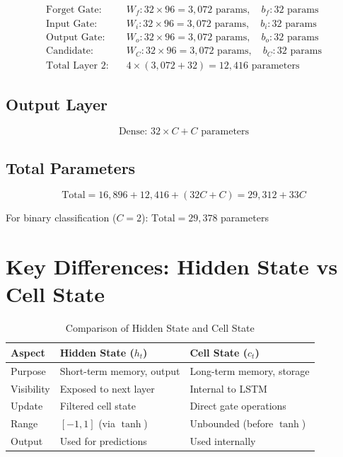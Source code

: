 \documentclass[12pt]{article}
\begin{document}
\[
\begin{aligned}
\text{Forget Gate:} &\quad W_f: 32 \times 96 = 3,072 \text{ params}, \quad b_f: 32 \text{ params} \\
\text{Input Gate:} &\quad W_i: 32 \times 96 = 3,072 \text{ params}, \quad b_i: 32 \text{ params} \\
\text{Output Gate:} &\quad W_o: 32 \times 96 = 3,072 \text{ params}, \quad b_o: 32 \text{ params} \\
\text{Candidate:} &\quad W_C: 32 \times 96 = 3,072 \text{ params}, \quad b_C: 32 \text{ params} \\
\text{Total Layer 2:} &\quad 4 \times (3,072 + 32) = 12,416 \text{ parameters}
\end{aligned}
\]

\subsection{Output Layer}

\[
\text{Dense: } 32 \times C + C \text{ parameters}
\]

\subsection{Total Parameters}

\[
\text{Total} = 16,896 + 12,416 + (32C + C) = 29,312 + 33C
\]

For binary classification ($C = 2$): $\text{Total} = 29,378$ parameters

\section{Key Differences: Hidden State vs Cell State}

\begin{table}[h]
\centering
\begin{tabular}{|l|l|l|}
\hline
\textbf{Aspect} & \textbf{Hidden State ($h_t$)} & \textbf{Cell State ($c_t$)} \\
\hline
Purpose & Short-term memory, output & Long-term memory, storage \\
Visibility & Exposed to next layer & Internal to LSTM \\
Update & Filtered cell state & Direct gate operations \\
Range & $[-1, 1]$ (via $\tanh$) & Unbounded (before $\tanh$) \\
Output & Used for predictions & Used internally \\
\hline
\end{tabular}
\caption{Comparison of Hidden State and Cell State}
\end{table}
\end{document}
